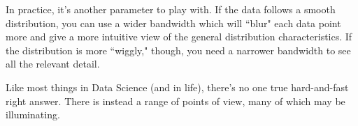 \documentclass[12pt]{article}
\begin{document}
In practice, it's another parameter to play with. If the data follows a smooth
distribution, you can use a wider bandwidth which will ``blur" each data point
more and give a more intuitive view of the general distribution
characteristics. If the distribution is more ``wiggly," though, you need a
narrower bandwidth to see all the relevant detail.

Like most things in Data Science (and in life), there's no one true
hard-and-fast right answer. There is instead a range of points of view, many
of which may be illuminating.
\end{document}
